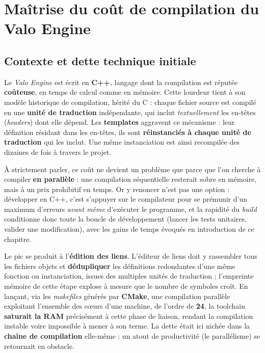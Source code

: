 \section{Maîtrise du coût de compilation du Valo Engine}
\label{chap:t2}


\subsection{Contexte et dette technique initiale}
Le \emph{Valo Engine} est écrit en \textbf{C++}, langage dont la compilation est
réputée \textbf{coûteuse}, en temps de calcul comme en mémoire. Cette lourdeur
tient à son modèle historique de compilation, hérité du C : chaque fichier source
est compilé en une \textbf{unité de traduction} indépendante, qui inclut
\emph{textuellement} les en-têtes (\emph{headers}) dont elle dépend. Les
\textbf{templates} aggravent ce mécanisme : leur définition résidant dans les
en-têtes, ils sont \textbf{réinstanciés à chaque unité de traduction} qui les
inclut. Une même instanciation est ainsi recompilée des dizaines de fois à
travers le projet.

À strictement parler, ce coût ne devient un problème que parce que l'on
cherche à compiler \textbf{en parallèle} : une compilation séquentielle
resterait sobre en mémoire, mais à un prix prohibitif en temps. Or y
renoncer n'est pas une option : développer en C++, c'est s'appuyer sur le
compilateur pour se prémunir d'un maximum d'erreurs \emph{avant même}
d'exécuter le programme, et la rapidité du \emph{build} conditionne donc
toute la boucle de développement (lancer les tests unitaires, valider une
modification), avec les gains de temps évoqués en introduction de ce
chapitre.

Le pic se produit à l'\textbf{édition des liens}. L'éditeur de liens doit y
rassembler tous les fichiers objets et \textbf{dédupliquer} les définitions
redondantes d'une même fonction ou instanciation, issues des multiples unités de
traduction ; l'empreinte mémoire de cette étape explose à mesure que le nombre de
symboles croît. En lançant, via les \emph{makefiles} générés par \textbf{CMake}, une compilation
parallèle exploitant l'ensemble des cœurs d'une machine, de l'ordre de
\textbf{24}, la \gls{toolchain} \textbf{saturait la RAM} précisément à cette
phase de liaison, rendant la compilation instable
voire impossible à mener à son terme. La dette était ici nichée dans la
\textbf{chaîne de compilation} elle-même : un atout de productivité (le
parallélisme) se retournait en obstacle.

